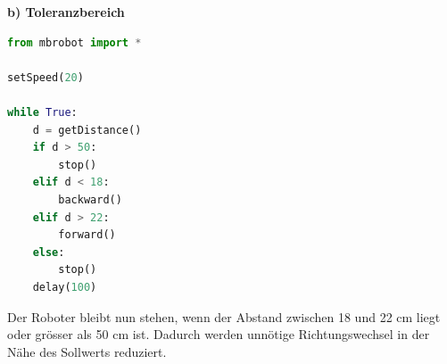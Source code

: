 \begin{myexercise}
\begin{myanswer}




        \textbf{b) Toleranzbereich}

        \begin{lstlisting}[language=Python]
from mbrobot import *

setSpeed(20)

while True:
    d = getDistance()
    if d > 50:
        stop()
    elif d < 18:
        backward()
    elif d > 22:
        forward()
    else:
        stop()
    delay(100)
        \end{lstlisting}

        Der Roboter bleibt nun stehen, wenn der Abstand
        zwischen 18 und 22 cm liegt oder grösser als
        50 cm ist. Dadurch werden unnötige
        Richtungswechsel in der Nähe des Sollwerts
        reduziert.
    \end{myanswer}
\end{myexercise}



